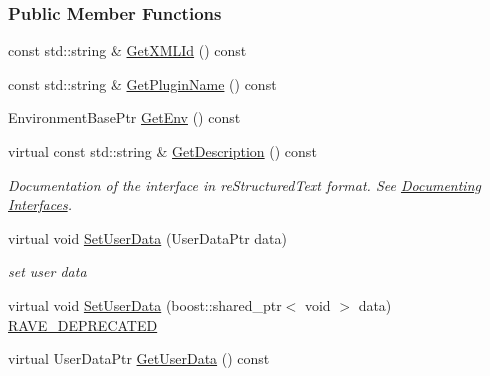 \subsubsection*{Public Member Functions}
\begin{DoxyCompactItemize}
\item 
const std::string \& \hyperlink{classOpenRAVE_1_1InterfaceBase_a23e085422cc13cf058b9f9558a7d9de6}{GetXMLId} () const 
\item 
const std::string \& \hyperlink{classOpenRAVE_1_1InterfaceBase_a909d5f1a5ae6d3fbb73b69c26b3e6bb4}{GetPluginName} () const 
\item 
EnvironmentBasePtr \hyperlink{classOpenRAVE_1_1InterfaceBase_a847c7f827694fd3db16f20b5669e1743}{GetEnv} () const 
\item 
\hypertarget{classOpenRAVE_1_1InterfaceBase_a1b571821be060055bf6f2474e12fa5a3}{
virtual const std::string \& \hyperlink{classOpenRAVE_1_1InterfaceBase_a1b571821be060055bf6f2474e12fa5a3}{GetDescription} () const }
\label{classOpenRAVE_1_1InterfaceBase_a1b571821be060055bf6f2474e12fa5a3}

\begin{DoxyCompactList}\small\item\em Documentation of the interface in reStructuredText format. See \hyperlink{writing__plugins_writing_plugins_doc}{Documenting Interfaces}. \item\end{DoxyCompactList}\item 
\hypertarget{classOpenRAVE_1_1InterfaceBase_ab3a2d5e41d756988959d9f5cdccfe284}{
virtual void \hyperlink{classOpenRAVE_1_1InterfaceBase_ab3a2d5e41d756988959d9f5cdccfe284}{SetUserData} (UserDataPtr data)}
\label{classOpenRAVE_1_1InterfaceBase_ab3a2d5e41d756988959d9f5cdccfe284}

\begin{DoxyCompactList}\small\item\em set user data \item\end{DoxyCompactList}\item 
virtual void \hyperlink{classOpenRAVE_1_1InterfaceBase_aba2de87983f5e6ad881df19cc6198018}{SetUserData} (boost::shared\_\-ptr$<$ void $>$ data) \hyperlink{namespaceOpenRAVE_af23fc4c2c72950a8c02f38ef71680bc6}{RAVE\_\-DEPRECATED}
\item 
\hypertarget{classOpenRAVE_1_1InterfaceBase_a975ebca32c743c8530807758e7c46618}{
virtual UserDataPtr \hyperlink{classOpenRAVE_1_1InterfaceBase_a975ebca32c743c8530807758e7c46618}{GetUserData} () const }
\label{classOpenRAVE_1_1InterfaceBase_a975ebca32c743c8530807758e7c46618}


\end{DoxyCompactItemize}
